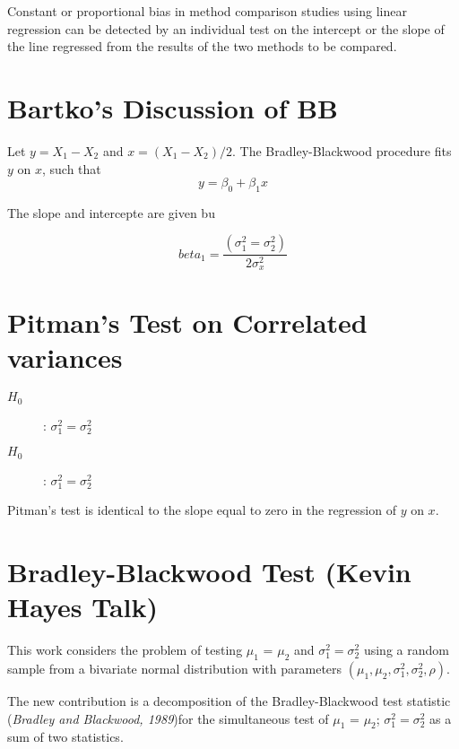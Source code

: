 \documentclass[12pt, a4paper]{report}
\theoremstyle{plain}
\theoremstyle{definition}
\theoremstyle{remark}
\begin{document}
Constant or proportional bias in method comparison studies using linear regression can be detected by an individual test on the intercept or the slope of the line regressed from the results of the two methods to be compared.





\section*{Bartko's Discussion of BB}

Let $y = X_1 - X_2$ and $x= (X_1 - X_2)/2$.
The Bradley-Blackwood procedure fits $y$ on $x$, such that
\[ y = \beta_0 + \beta_1x \]

The slope and intercepte are given bu

\[beta_1 =  \frac{(\sigma^2_1 = \sigma^2_2)}{2\sigma^2_x}\]


\section*{Pitman's Test on Correlated variances}
\begin{description}
	\item[$H_0$] : $\sigma^2_1 = \sigma^2_2$
	\item[$H_0$] : $\sigma^2_1 = \sigma^2_2$
\end{description}


Pitman's test is identical to the slope equal to zero in the regression of $y$ on $x$.



\section{Bradley-Blackwood Test (Kevin Hayes Talk)}

This work considers the problem of testing $\mu_1$ = $\mu_2$ and $\sigma^2_1 = \sigma^2_2$ using a random sample from a 
bivariate normal distribution with parameters $(\mu_1, \mu_2, \sigma^2_1, \sigma^2_2, \rho)$. 

The new contribution is a decomposition of the Bradley-Blackwood test statistic (\textit{Bradley and Blackwood, 1989})for 
the simultaneous test of {$\mu_1$ = $\mu_2$; $\sigma^2_1 = \sigma^2_2$}  as a sum of two statistics. 
\end{document}
